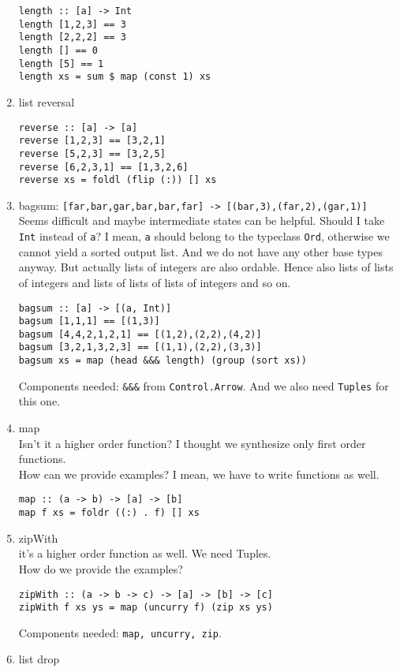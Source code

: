 \begin{enumerate}
\begin{lstlisting}
length :: [a] -> Int
length [1,2,3] == 3
length [2,2,2] == 3
length [] == 0
length [5] == 1
length xs = sum $ map (const 1) xs
	\end{lstlisting}
%
	\item list reversal
	\begin{lstlisting}
reverse :: [a] -> [a]
reverse [1,2,3] == [3,2,1]
reverse [5,2,3] == [3,2,5]
reverse [6,2,3,1] == [1,3,2,6]
reverse xs = foldl (flip (:)) [] xs
	\end{lstlisting}
%
	\item bagsum: \lstinline![far,bar,gar,bar,bar,far] -> [(bar,3),(far,2),(gar,1)]!\\
	Seems difficult and maybe intermediate states can be helpful. Should I take \lstinline?Int? instead of \lstinline?a?? I mean, \lstinline?a? should belong to the typeclass \lstinline?Ord?, otherwise we cannot yield a sorted output list. And we do not have any other base types anyway. But actually lists of integers are also ordable. Hence also lists of lists of integers and lists of lists of lists of integers and so on.
	\begin{lstlisting}
bagsum :: [a] -> [(a, Int)]
bagsum [1,1,1] == [(1,3)]
bagsum [4,4,2,1,2,1] == [(1,2),(2,2),(4,2)]
bagsum [3,2,1,3,2,3] == [(1,1),(2,2),(3,3)]
bagsum xs = map (head &&& length) (group (sort xs))
	\end{lstlisting}
	Components needed: \lstinline?&&&? from \lstinline?Control.Arrow?. And we also need \lstinline?Tuples? for this one.
%
	\item map \\
	Isn't it a higher order function? I thought we synthesize only first order functions.\\
	How can we provide examples? I mean, we have to write functions as well.\\
	\begin{lstlisting}
map :: (a -> b) -> [a] -> [b]
map f xs = foldr ((:) . f) [] xs
	\end{lstlisting}
%
	\item zipWith \\
	it's a higher order function as well. We need Tuples.\\
	How do we provide the examples?
	\begin{lstlisting}
zipWith :: (a -> b -> c) -> [a] -> [b] -> [c]
zipWith f xs ys = map (uncurry f) (zip xs ys)
	\end{lstlisting}
	Components needed: \lstinline?map, uncurry, zip?.
%
	\item list drop

\end{enumerate}
